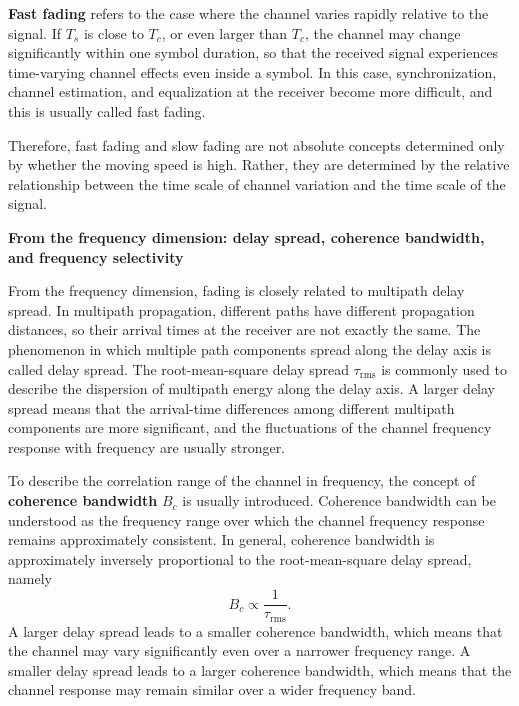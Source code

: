 \textbf{Fast fading} refers to the case where the channel varies rapidly relative to the signal.
If \(T_s\) is close to \(T_c\),
or even larger than \(T_c\),
the channel may change significantly within one symbol duration,
so that the received signal experiences time-varying channel effects even inside a symbol.
In this case,
synchronization,
channel estimation,
and equalization at the receiver become more difficult,
and this is usually called fast fading.

Therefore,
fast fading and slow fading are not absolute concepts determined only by whether the moving speed is high.
Rather,
they are determined by the relative relationship between the time scale of channel variation
and the time scale of the signal.

\noindent\textbullet\quad\textbf{From the frequency dimension: delay spread, coherence bandwidth, and frequency selectivity}

From the frequency dimension,
fading is closely related to multipath delay spread.
In multipath propagation,
different paths have different propagation distances,
so their arrival times at the receiver are not exactly the same.
The phenomenon in which multiple path components spread along the delay axis is called delay spread.
The root-mean-square delay spread \(\tau_{\mathrm{rms}}\) is commonly used
to describe the dispersion of multipath energy along the delay axis.
A larger delay spread means that the arrival-time differences among different multipath components are more significant,
and the fluctuations of the channel frequency response with frequency are usually stronger.

To describe the correlation range of the channel in frequency,
the concept of \textbf{coherence bandwidth} \(B_c\) is usually introduced.
Coherence bandwidth can be understood as the frequency range over which the channel frequency response remains approximately consistent.
In general,
coherence bandwidth is approximately inversely proportional to the root-mean-square delay spread,
namely
\begin{equation}
    B_c
    \propto
    \frac{1}{\tau_{\mathrm{rms}}}.
    \label{eq:coherence-bandwidth}
\end{equation}
A larger delay spread leads to a smaller coherence bandwidth,
which means that the channel may vary significantly even over a narrower frequency range.
A smaller delay spread leads to a larger coherence bandwidth,
which means that the channel response may remain similar over a wider frequency band.

